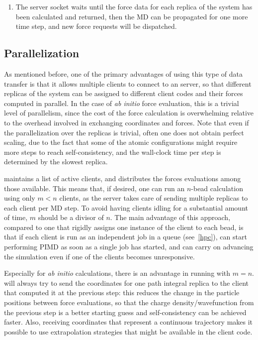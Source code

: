 \documentclass[11pt,english,fleqn]{report}
\begin{document}
\begin{enumerate}
\begin{description}
\end{description}
\item The server socket waits until the force data for each replica of the
system has been calculated and returned, then the MD can be propagated for
one more time step, and new force requests will be dispatched.
\end{enumerate}

\subsection{Parallelization}

As mentioned before, one of the primary advantages of using this type
of data transfer is that it allows multiple clients to connect
to an \ipi server, so that different replicas of the system can be
assigned to different client codes and their forces computed in parallel.
In the case of \emph{ab initio} force evaluation, this is a trivial
level of parallelism, since the cost of the force calculation
is overwhelming relative to the overhead involved in exchanging 
coordinates and forces. Note that even if the parallelization over
the replicas is trivial, often one does not obtain perfect scaling,
due to the fact that some of the atomic configurations might require
more steps to reach self-consistency, and the wall-clock time per step
is determined by the slowest replica.

\ipi maintains a list of active clients, and distributes the forces
evaluations among those available. This means that, if desired, one 
can run an $n$-bead calculation using only $m<n$ clients, as the 
server takes care of sending multiple replicas to each client per 
MD step. To avoid having clients idling for a substantial amount
of time, $m$ should be a divisor of $n$. The main advantage of 
this approach, compared to one that rigidly assigns one instance of
the client to each bead, is that if each client is run as an independent
job in a queue (see~\ref{hpc}), \ipi can start performing PIMD
as soon as a single job has started, and can carry on advancing the
simulation even if one of the clients becomes unresponsive.

Especially for \emph{ab initio} calculations, there is an advantage
in running with $m=n$. \ipi will always try to send the coordinates for one
path integral replica to the client that computed it at the previous 
step: this reduces the change in the particle positions between 
force evaluations, so that the charge density/wavefunction from the 
previous step is a better starting guess and self-consistency can be 
achieved faster. Also, receiving coordinates that represent a continuous
trajectory makes it possible to use extrapolation
strategies that might be available in the client code.
\end{document}
